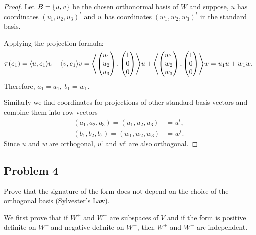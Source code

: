 \documentclass{article}
\theoremstyle{definition}
\DeclarePairedDelimiter\set{\{}{\}}
\DeclarePairedDelimiter\bilform{\langle}{\rangle}
\begin{document}
\begin{proof}

Let $B = \set{ u, v }$ be the chosen orthonormal basis of $W$ and suppose, $u$ has coordinates $(u_1, u_2, u_3)^t$ and $w$ has coordinates $(w_1,w_2,w_3)^t$ in the standard basis.

Applying the projection formula:
\[
    \pi(e_1) =
    \bilform{u, e_1} u + \bilform{v, e_1} v 
    = \bilform*{
        \begin{pmatrix}
            u_1 \\ u_2 \\ u_3
        \end{pmatrix},
        \begin{pmatrix}
            1 \\ 0 \\ 0
        \end{pmatrix}
    } u
    +
    \bilform*{
        \begin{pmatrix}
            w_1 \\ w_2 \\ w_3
        \end{pmatrix},
        \begin{pmatrix}
            1 \\ 0 \\ 0
        \end{pmatrix}
    } w
    = u_1 u + w_1 w.
\]
Therefore, $a_1 = u_1, \> b_1 = w_1$.

Similarly we find coordinates for projections of other standard basis vectors and combine them into row vectors
\begin{align*}
    (a_1, a_2, a_3) = (u_1, u_2, u_3) & = u^t, \\ 
    (b_1, b_2, b_3) = (w_1, w_2, w_3) & = w^t.
\end{align*}
Since $u$ and $w$ are orthogonal, $u^t$ and $w^t$ are also orthogonal.

\end{proof}


\subsection*{Problem 4}

\begin{tcolorbox}
Prove that the signature of the form does not depend on the choice of the orthogonal basis (Sylvester's Law).
\end{tcolorbox}

We first prove that if $W^+$ and $W^-$ are subspaces of $V$ and if the form is positive definite on $W^+$ and negative definite on $W^-$, then $W^+$ and $W^-$ are independent.
\end{document}
